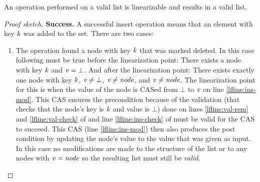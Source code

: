 \begin{lemma}
\label{lemma:insert-linlf}
An  operation performed on a valid list is linearizable and results in a valid list.
\end{lemma}
\begin{proof}[Proof sketch]
{\bf Success.} A successful insert operation means that an element with key $\ms{k}$
was added to the set.
There are two cases:
\begin{enumerate} 
  \item The operation found a node with key $\ms{k}$ that was marked deleted.
In this case following must be true before the linearization point:
There exists a node with key $\ms{k}$ and $\ms{v} = \bot$.
And after the linearization point:
There exists exactly one node with key $\ms{k}$, $\ms{v} \neq \bot$, $\ms{v} \neq \ms{node}$, and $\ms{v \neq node}$.
The linearization point for this is when the value of the node is CASed from $\bot$ to $\ms{v}$ on line
\ref{lfline:ins-mod}.
This CAS ensures the precondition because of the validation (that checks that the node's key is $\ms{k}$ and value is $\bot$)
done on lines \ref{lfline:val-rem} and \ref{lfline:val-check} of 
and line \ref{lfline:ins-check} of  must be valid for the CAS to succeed.
This CAS (line \ref{lfline:ins-mod}) then also produces the post condition by updating the node's value to the value that was given as input.
In this case no modifications are made to the structure of the list or to any nodes with $\ms{v = node}$ so the resulting list must still be \emph{valid}.


\end{enumerate}
\end{proof}
